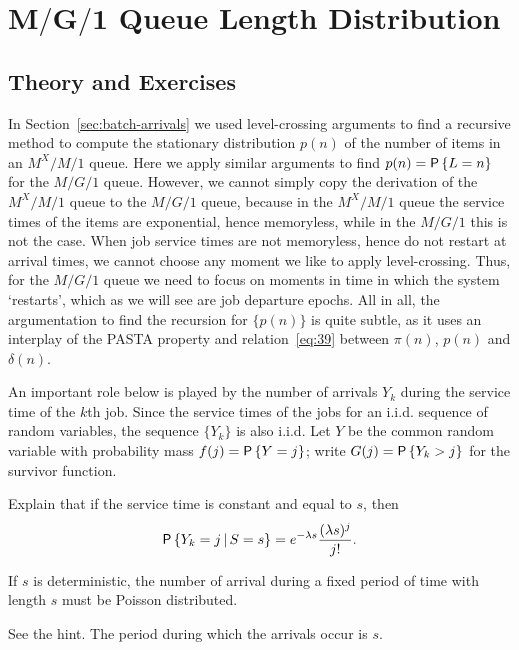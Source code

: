 \section
[$M/G/1$ Queue Length Distribution]
{$\mathbf{M/G/1}$ Queue Length Distribution}
\label{sec:distr-queue-length}


\subsection*{Theory and Exercises}



In Section~\ref{sec:batch-arrivals} we used level-crossing arguments 
to find a recursive method to compute  the stationary distribution $p(n)$ of the number of items in an $M^X/M/1$ queue. Here we apply similar arguments to find $p(n)=\P{L=n}$ for the $M/G/1$ queue.
However, we cannot simply copy the derivation of the $M^X/M/1$ queue to the $M/G/1$ queue, because in the $M^X/M/1$ queue the service times of the items are exponential,
hence memoryless, while in the $M/G/1$ this is not the case. When job service times are 
not memoryless, hence do not restart at arrival times, we cannot choose any moment we like to apply level-crossing. Thus, for the $M/G/1$ queue
we need to focus on moments in time in which the system `restarts', which as we will see are job departure epochs.  All in all, the argumentation to find the recursion for $\{p(n)\}$ is quite subtle, as it uses an interplay of the PASTA property and relation~\eqref{eq:39}
between $\pi(n)$, $p(n)$ and $\delta(n)$.  

An important role below is played by  the number of  arrivals $Y_k$ during the service time of the $k$th job.  Since the service times of the jobs for an i.i.d. sequence of random variables, the sequence $\{Y_k\}$ is also i.i.d. Let $Y$ be the common random variable with probability mass
 $f(j) = \P{Y = j}$; write $G(j) = \P{Y_k > j}$ for the survivor function.


\begin{exercise}
 Explain that if the service time is constant and equal to $s$, then
\begin{equation}\label{eq:4}
  \P{Y_k = j\given S=s} = e^{-\lambda s}\frac{(\lambda s)^j}{j!}.
\end{equation}
\begin{hint}
If $s$ is deterministic, the number of arrival during a fixed
    period of time with length $s$ must be Poisson distributed.
\end{hint}
  \begin{solution}
See the hint.  The period during which the arrivals occur is $s$. 
  \end{solution}
\end{exercise}

